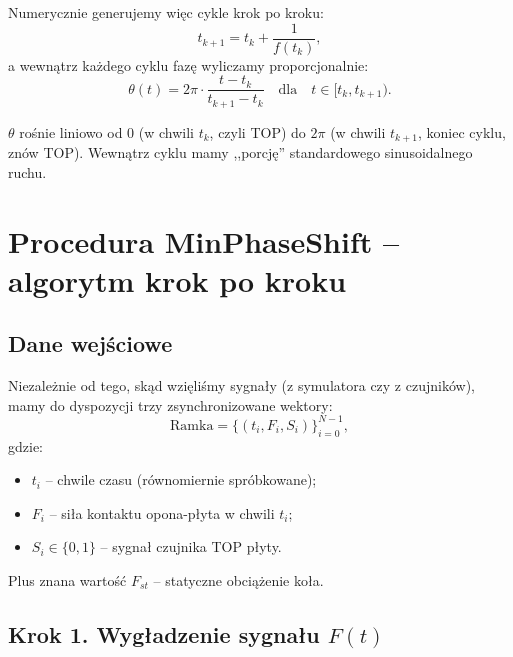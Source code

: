 \documentclass[11pt,a4paper]{article}
\theoremstyle{plainpol}
\begin{document}
Numerycznie generujemy więc cykle krok po kroku:
\begin{equation}
  t_{k+1} = t_k + \dfrac{1}{f(t_k)},
\end{equation}
a wewnątrz każdego cyklu fazę wyliczamy proporcjonalnie:
\begin{equation}
  \theta(t) = 2\pi\cdot\dfrac{t - t_k}{t_{k+1} - t_k}\quad \text{dla}\quad t\in[t_k, t_{k+1}).
\end{equation}

\begin{intuicja}
$\theta$ rośnie liniowo od $0$ (w chwili $t_k$, czyli TOP) do $2\pi$
(w chwili $t_{k+1}$, koniec cyklu, znów TOP). Wewnątrz cyklu mamy
,,porcję'' standardowego sinusoidalnego ruchu.
\end{intuicja}

\section{Procedura MinPhaseShift -- algorytm krok po kroku}\label{sec:procedura}

\subsection{Dane wejściowe}

Niezależnie od tego, skąd wzięliśmy sygnały (z symulatora czy z czujników),
mamy do dyspozycji trzy zsynchronizowane wektory:
\begin{equation}
  \mathrm{Ramka} = \bigl\{(t_i, F_i, S_i)\bigr\}_{i=0}^{N-1},
\end{equation}
gdzie:
\begin{itemize}
  \item $t_i$ -- chwile czasu (równomiernie spróbkowane);
  \item $F_i$ -- siła kontaktu opona-płyta w chwili $t_i$;
  \item $S_i \in \{0, 1\}$ -- sygnał czujnika TOP płyty.
\end{itemize}

Plus znana wartość $F_{st}$ -- statyczne obciążenie koła.

\subsection{Krok 1. Wygładzenie sygnału $F(t)$}
\end{document}
